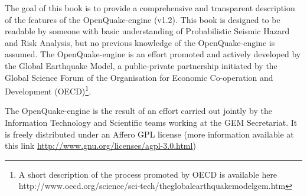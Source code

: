 The goal of this book is to provide a comprehensive and transparent description
of the features of the OpenQuake-engine (v1.2). This book is designed to be 
readable by someone with basic understanding of Probabilistic Seismic Hazard 
and Risk Analysis, but no previous knowledge of the OpenQuake-engine is assumed.
%
The OpenQuake-engine is an effort promoted and actively developed by the
Global Earthquake Model, a public-private partnership initiated by the Global
Science Forum of the Organisation for Economic Co-operation and Development 
(OECD)\footnote{A short description of the process promoted by OECD is available 
here http://www.oecd.org/science/sci-tech/theglobalearthquakemodelgem.htm}.

The OpenQuake-engine is the result of an effort carried out jointly by the
Information Technology and Scientific teams working at the GEM Secretariat. 
It is freely distributed under an Affero GPL license 
(more information available at this link 
\href{http://www.gnu.org/licenses/agpl-3.0.html}{http://www.gnu.org/licenses/agpl-3.0.html})
